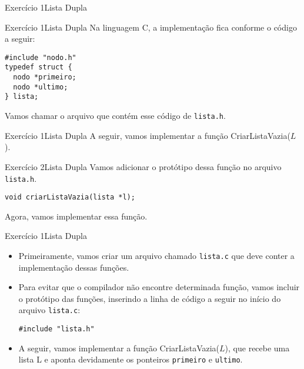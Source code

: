 \documentclass[aspectratio=169]{beamer}
\begin{document}
\begin{frame}{Exercício 1}{Lista Dupla}
\begin{algorithm}[H]
\caption{Lista} 
\label{Lista}
\end{algorithm} 
\end{frame}


\begin{frame}[fragile]{Exercício 1}{Lista Dupla}
Na linguagem C, a implementação fica conforme o código a seguir:
\begin{lstlisting}[style=CStyle]
#include "nodo.h"
typedef struct {
  nodo *primeiro;
  nodo *ultimo;
} lista;
\end{lstlisting}  
Vamos chamar o arquivo que contém esse código de \verb|lista.h|.
\end{frame}


\begin{frame}[fragile]{Exercício 1}{Lista Dupla}
A seguir, vamos implementar a função CriarListaVazia($L$).
\end{frame}


\begin{frame}[fragile]{Exercício 2}{Lista Dupla}
Vamos adicionar o protótipo dessa função no arquivo \verb|lista.h|.
\begin{lstlisting}[style=CStyle]
void criarListaVazia(lista *l);
\end{lstlisting}  
Agora, vamos implementar essa função. 
\end{frame}



\begin{frame}[fragile]{Exercício 1}{Lista Dupla}
\begin{itemize}
\item Primeiramente, vamos criar um arquivo chamado \verb|lista.c| que deve conter a implementação dessas funções.
\item Para evitar que o compilador não encontre determinada função, vamos incluir o protótipo das funções, inserindo a linha de código a seguir no início do arquivo \verb|lista.c|:
\begin{lstlisting}[style=CStyle]
#include "lista.h"
\end{lstlisting}  
\item A seguir, vamos implementar a função CriarListaVazia($L$), que recebe uma lista L e aponta devidamente os ponteiros \verb|primeiro| e \verb|ultimo|. 
\end{itemize} 
\end{frame}
\end{document}
